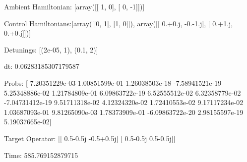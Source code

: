 \documentclass{article}
\begin{document}
    

\newpage

Ambient Hamiltonian: [array([[ 1,  0],
       [ 0, -1]])]

Control Hamiltonians:[array([[0, 1],
       [1, 0]]), array([[ 0.+0.j, -0.-1.j],
       [ 0.+1.j,  0.+0.j]])]

Detunings: [(2e-05, 1), (0.1, 2)]

 dt: 0.06283185307179587

Probs: [  7.20351229e-03   1.00851599e-01   1.26038503e-18  -7.58941521e-19
   5.25348886e-02   1.21784809e-01   6.09863722e-19   6.52555512e-02
   6.32358779e-02  -7.04731412e-19   9.51711318e-02   4.12324320e-02
   1.72410553e-02   9.17117234e-02   1.03687093e-01   9.81265090e-03
   1.78373909e-01  -6.09863722e-20   2.98155597e-19   5.19037665e-02]

Target Operator: [[ 0.5-0.5j -0.5+0.5j]
 [ 0.5-0.5j  0.5-0.5j]]

Time: 585.769152879715
\end{document}

